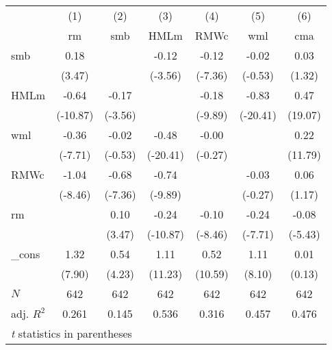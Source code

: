 \begin{tabular}{l*{6}{c}}
\hline\hline
          &\multicolumn{1}{c}{(1)}&\multicolumn{1}{c}{(2)}&\multicolumn{1}{c}{(3)}&\multicolumn{1}{c}{(4)}&\multicolumn{1}{c}{(5)}&\multicolumn{1}{c}{(6)}\\
          &\multicolumn{1}{c}{rm}&\multicolumn{1}{c}{smb}&\multicolumn{1}{c}{HMLm}&\multicolumn{1}{c}{RMWc}&\multicolumn{1}{c}{wml}&\multicolumn{1}{c}{cma}\\
\hline
smb       &     0.18&         &    -0.12&    -0.12&    -0.02&     0.03\\
          &   (3.47)&         &  (-3.56)&  (-7.36)&  (-0.53)&   (1.32)\\
[1em]
HMLm      &    -0.64&    -0.17&         &    -0.18&    -0.83&     0.47\\
          & (-10.87)&  (-3.56)&         &  (-9.89)& (-20.41)&  (19.07)\\
[1em]
wml       &    -0.36&    -0.02&    -0.48&    -0.00&         &     0.22\\
          &  (-7.71)&  (-0.53)& (-20.41)&  (-0.27)&         &  (11.79)\\
[1em]
RMWc      &    -1.04&    -0.68&    -0.74&         &    -0.03&     0.06\\
          &  (-8.46)&  (-7.36)&  (-9.89)&         &  (-0.27)&   (1.17)\\
[1em]
rm        &         &     0.10&    -0.24&    -0.10&    -0.24&    -0.08\\
          &         &   (3.47)& (-10.87)&  (-8.46)&  (-7.71)&  (-5.43)\\
[1em]
\_cons    &     1.32&     0.54&     1.11&     0.52&     1.11&     0.01\\
          &   (7.90)&   (4.23)&  (11.23)&  (10.59)&   (8.10)&   (0.13)\\
\hline
\(N\)     &      642&      642&      642&      642&      642&      642\\
adj. \(R^{2}\)&    0.261&    0.145&    0.536&    0.316&    0.457&    0.476\\
\hline\hline
\multicolumn{7}{l}{\footnotesize \textit{t} statistics in parentheses}\\
\end{tabular}
